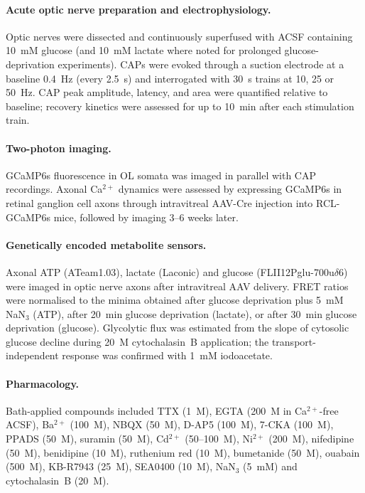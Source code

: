 \documentclass[11pt,a4paper]{article}
\begin{document}
\paragraph{Acute optic nerve preparation and electrophysiology.} Optic nerves were dissected and continuously superfused with ACSF containing 10~mM glucose (and 10~mM lactate where noted for prolonged glucose-deprivation experiments). CAPs were evoked through a suction electrode at a baseline 0.4~Hz (every 2.5~s) and interrogated with 30~s trains at 10, 25 or 50~Hz. CAP peak amplitude, latency, and area were quantified relative to baseline; recovery kinetics were assessed for up to 10~min after each stimulation train.

\paragraph{Two-photon imaging.} GCaMP6s fluorescence in OL somata was imaged in parallel with CAP recordings. Axonal Ca$^{2+}$ dynamics were assessed by expressing GCaMP6s in retinal ganglion cell axons through intravitreal AAV-Cre injection into RCL-GCaMP6s mice, followed by imaging 3--6 weeks later.

\paragraph{Genetically encoded metabolite sensors.} Axonal ATP (ATeam1.03), lactate (Laconic) and glucose (FLII12Pglu-700u$\delta$6) were imaged in optic nerve axons after intravitreal AAV delivery. FRET ratios were normalised to the minima obtained after glucose deprivation plus 5~mM NaN$_3$ (ATP), after 20~min glucose deprivation (lactate), or after 30~min glucose deprivation (glucose). Glycolytic flux was estimated from the slope of cytosolic glucose decline during 20~\textmu M cytochalasin~B application; the transport-independent response was confirmed with 1~mM iodoacetate.

\paragraph{Pharmacology.} Bath-applied compounds included TTX (1~\textmu M), EGTA (200~\textmu M in Ca$^{2+}$-free ACSF), Ba$^{2+}$ (100~\textmu M), NBQX (50~\textmu M), D-AP5 (100~\textmu M), 7-CKA (100~\textmu M), PPADS (50~\textmu M), suramin (50~\textmu M), Cd$^{2+}$ (50--100~\textmu M), Ni$^{2+}$ (200~\textmu M), nifedipine (50~\textmu M), benidipine (10~\textmu M), ruthenium red (10~\textmu M), bumetanide (50~\textmu M), ouabain (500~\textmu M), KB-R7943 (25~\textmu M), SEA0400 (10~\textmu M), NaN$_3$ (5~mM) and cytochalasin~B (20~\textmu M).
\end{document}
